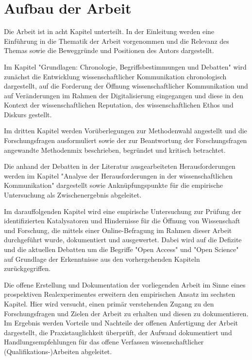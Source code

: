 \section{Aufbau der Arbeit}

Die Arbeit ist in acht Kapitel unterteilt. In der Einleitung werden eine Einführung in die Thematik der Arbeit vorgenommen und die Relevanz des Themas sowie die Beweggründe und Positionen des Autors dargestellt.

Im Kapitel "Grundlagen: Chronologie, Begriffsbestimmungen und Debatten" wird zunächst die Entwicklung wissenschaftlicher Kommunikation chronologisch dargestellt, auf die Forderung der Öffnung wissenschaftlicher Kommunikation und auf Veränderungen im Rahmen der Digitalisierung eingegangen und diese in den Kontext der wissenschaftlichen Reputation, des wissenschaftlichen Ethos und Diskurs gestellt.

Im dritten Kapitel werden Vorüberlegungen zur Methodenwahl angestellt und die Forschungsfragen ausformuliert sowie der zur Beantwortung der Forschungsfragen angewandte Methodenmix beschrieben, begründet und kritisch betrachtet.

Die anhand der Debatten in der Literatur ausgearbeiteten Herausforderungen werden im Kapitel "Analyse der Herausforderungen in der wissenschaftlichen Kommunikation" dargestellt sowie Anknüpfungspunkte für die empirische Untersuchung als Zwischenergebnis abgeleitet.

Im darauffolgenden Kapitel wird eine empirische Untersuchung zur Prüfung der identifizierten Katalysatoren und Hindernisse für die Öffnung von Wissenschaft und Forschung, die mittels einer Online-Befragung im Rahmen dieser Arbeit durchgeführt wurde, dokumentiert und ausgewertet. Dabei wird auf die Defizite und die aktuellen Debatten um die Begriffe "Open Access" und "Open Science" auf Grundlage der Erkenntnisse aus den vorhergehenden Kapiteln zurückgegriffen.

Die offene Erstellung und Dokumentation der vorliegenden Arbeit im Sinne eines prospektiven Realexperimentes erweitern den empirischen Ansatz im sechsten Kapitel. Hier wird versucht, einen primär verstehenden Zugang zu den Forschungsfragen und Zielen der Arbeit zu erhalten und diesen zu dokumentieren. Im Ergebnis werden Vorteile und Nachteile der offenen Anfertigung der Arbeit dargestellt, die Praxistauglichkeit überprüft, der Aufwand dokumentiert und Handlungsempfehlungen für das offene Verfassen wissenschaftlicher (Qualifikations-)Arbeiten abgeleitet.

